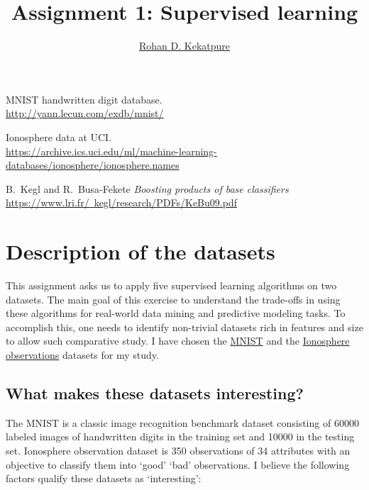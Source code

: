 \documentclass[10pt,letterpaper]{article}
\begin{document}
\title{\Large{Assignment 1: Supervised learning}}
\author{\href{mailto:rohan.kekatpure@gmail.com}{Rohan D. Kekatpure}}
\address{}
\email{}

\begin{thebibliography}{9}
MNIST handwritten digit database.\\
\href{\tt http://yann.lecun.com/exdb/mnist/}{http://yann.lecun.com/exdb/mnist/}

Ionosphere data at UCI.\\
\href{\tt https://archive.ics.uci.edu/ml/machine-learning-databases/ionosphere/ionosphere.names}{https://archive.ics.uci.edu/ml/machine-learning-databases/ionosphere/ionosphere.names}

B.~Kegl and R.~Busa-Fekete
{\it Boosting products of base classifiers} \\
\href{\tt https://www.lri.fr/~kegl/research/PDFs/KeBu09.pdf}{https://www.lri.fr/~kegl/research/PDFs/KeBu09.pdf}
\end{thebibliography}

\section{Description of the datasets}
This assignment asks us to apply five supervised learning algorithms on two datasets. The main goal of this exercise to understand the trade-offs in using these algorithms for real-world data mining and predictive modeling tasks. To accomplish this, one needs to identify non-trivial datasets rich in features and size to allow such comparative study. I have chosen the \href{http://yann.lecun.com/exdb/mnist/}{MNIST} \cite{mnist} and the \href{Its a binary classification problem allowing an easier comparative analysis of various learning algorithms.}{Ionosphere observations} \cite{ionosphere} datasets for my study. 

\subsection{What makes these datasets interesting?} 
The MNIST is a classic image recognition benchmark dataset consisting of 60000 labeled images of handwritten digits in the training set and 10000 in the testing set. Ionosphere observation dataset is 350 observations of 34 attributes with an objective to classify them into `good' `bad' observations. I believe the following factors qualify these datasets as `interesting':
\end{document}
